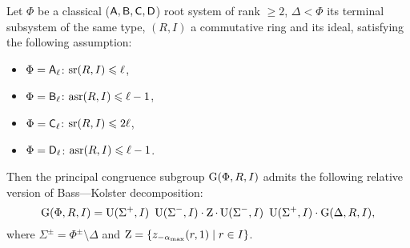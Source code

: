 \begin{thm}\label{thm:BassKolster}
Let $\Phi$ be a classical ($\mathsf{A},\mathsf{B},\mathsf{C},\mathsf{D}$) root system of rank $\geqslant2$, $\Delta<\Phi$ its terminal subsystem of the same type, $(R,I)$ a commutative ring and its ideal, satisfying the following assumption:
\begin{itemize}
\item $\Phi=\mathsf{A}_\ell$: $\operatorname{sr}(R,I)\leqslant\ell$,
\item $\Phi=\mathsf{B}_\ell$: $\operatorname{asr}(R,I)\leqslant\ell-1$,
\item $\Phi=\mathsf{C}_\ell$: $\operatorname{sr}(R,I)\leqslant2\ell$,
\item $\Phi=\mathsf{D}_\ell$: $\operatorname{asr}(R,I)\leqslant\ell-1$.
\end{itemize}
Then the principal congruence subgroup $\operatorname{G}(\Phi,R,I)$ admits the following relative version of Bass---Kolster decomposition:
\[ \operatorname{G}(\Phi,R,I)=\operatorname{U}(\Sigma^+,I)\ \operatorname{U}(\Sigma^-,I)\cdot \operatorname{Z}\cdot \operatorname{U}(\Sigma^-,I)\ \operatorname{U}(\Sigma^+,I)\cdot \operatorname{G}(\Delta,R,I), \]
where $\Sigma^\pm=\Phi^\pm\setminus\Delta$ and $\operatorname{Z}=\{ z_{-\alpha_\mathrm{max}}(r,1)\mid r\in I \}$.
\end{thm}
